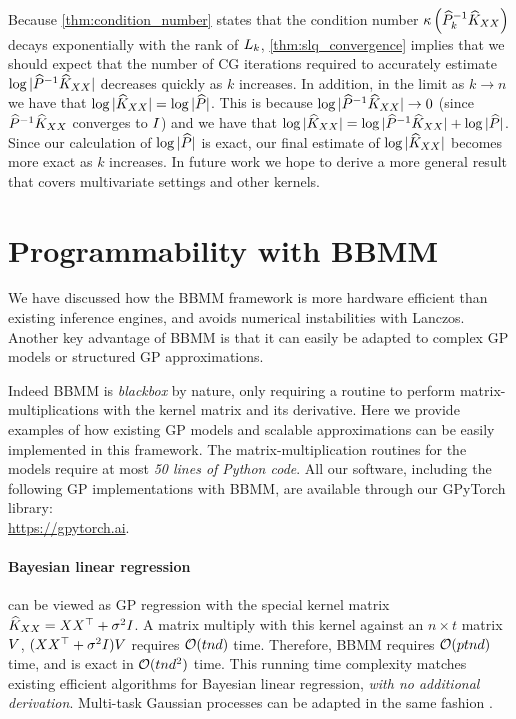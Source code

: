 Because \cref{thm:condition_number} states that the condition number $\kappa \left( \widehat{P}_{k}^{-1}\widehat{K}_{XX} \right)$ decays exponentially with the rank of $L_{k}$, \cref{thm:slq_convergence} implies that we should expect that the number of CG iterations required to accurately estimate $\log \vert \widehat{P}^{-1}\widehat{K}_{XX} \vert$ decreases quickly as $k$ increases.
In addition, in the limit as $k \rightarrow n$ we have that $\log \vert \widehat{K}_{XX} \vert = \log \vert \widehat{P} \vert$.
This is because $\log \vert \widehat{P}^{-1}\widehat{K}_{XX} \vert \rightarrow 0$ (since $\widehat{P}^{-1}\widehat{K}_{XX}$ converges to $I$) and we have that $\log \vert \widehat{K}_{XX} \vert = \log \vert \widehat{P}^{-1}\widehat{K}_{XX} \vert + \log \vert \widehat{P} \vert$.
Since our calculation of $\log \vert \widehat{P} \vert$ is exact, our final estimate of $\log \vert \widehat{K}_{XX} \vert$ becomes more exact as $k$ increases.
In future work we hope to derive a more general result that covers multivariate settings and other kernels.
%
\section{Programmability with BBMM}
\label{sec:advantages}
We have discussed how the BBMM framework is more hardware efficient than existing inference engines, and avoids numerical instabilities with Lanczos. Another key advantage of BBMM is that it can easily be adapted to complex GP models or structured GP approximations.

Indeed BBMM is \emph{blackbox} by nature, only requiring a routine to perform matrix-multiplications with the kernel matrix and its derivative.
Here we provide examples of how existing GP models and scalable approximations can be easily implemented in this framework.
The matrix-multiplication routines for the models require at most \emph{50 lines of Python code}.
All our software, including the following GP implementations with BBMM, are available through our GPyTorch library: \\
\url{https://gpytorch.ai}.
%

\paragraph{Bayesian linear regression} can be viewed as GP regression with the special kernel matrix $\widehat{K}_{XX} = XX^{\top} + \sigma^{2}I$.
A matrix multiply with this kernel against an $n \times t$ matrix $V$, $(XX^{\top} + \sigma^{2}I)V$ requires $\bigo{tnd}$ time.
Therefore, BBMM requires $\bigo{ptnd}$ time, and is exact in $\bigo{tnd^2}$ time.
This running time complexity matches existing efficient algorithms for Bayesian linear regression, \emph{with no additional derivation}.
Multi-task Gaussian processes \cite{bonilla2008multi} can be adapted in the same fashion \cite{gardner2018product}.

